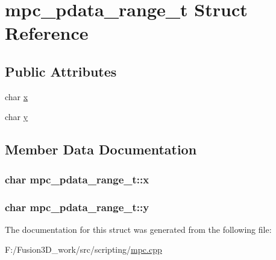\hypertarget{structmpc__pdata__range__t}{}\section{mpc\+\_\+pdata\+\_\+range\+\_\+t Struct Reference}
\label{structmpc__pdata__range__t}
\subsection*{Public Attributes}
\begin{DoxyCompactItemize}
\item 
char \hyperlink{structmpc__pdata__range__t_a8a4c4a28915c50c41f748d017c63cb96}{x}
\item 
char \hyperlink{structmpc__pdata__range__t_ae151774c6b911fb40489b9fe03855877}{y}
\end{DoxyCompactItemize}


\subsection{Member Data Documentation}
\hypertarget{structmpc__pdata__range__t_a8a4c4a28915c50c41f748d017c63cb96}{}
\subsubsection[{x}]{\setlength{\rightskip}{0pt plus 5cm}char mpc\+\_\+pdata\+\_\+range\+\_\+t\+::x}\label{structmpc__pdata__range__t_a8a4c4a28915c50c41f748d017c63cb96}
\hypertarget{structmpc__pdata__range__t_ae151774c6b911fb40489b9fe03855877}{}
\subsubsection[{y}]{\setlength{\rightskip}{0pt plus 5cm}char mpc\+\_\+pdata\+\_\+range\+\_\+t\+::y}\label{structmpc__pdata__range__t_ae151774c6b911fb40489b9fe03855877}


The documentation for this struct was generated from the following file\+:\begin{DoxyCompactItemize}
\item 
F\+:/\+Fusion3\+D\+\_\+work/src/scripting/\hyperlink{mpc_8cpp}{mpc.\+cpp}\end{DoxyCompactItemize}
